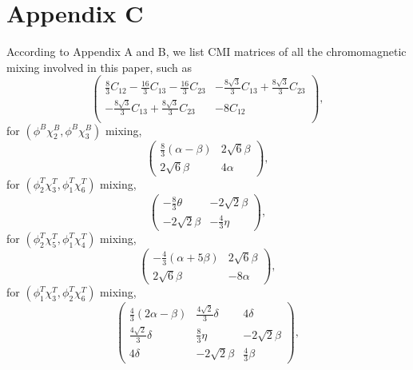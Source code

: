 \documentclass[prd,twocolumn,floatfix,nofootinbib]{revtex4}
\begin{document}
\section*{Appendix C}\label{AppendixC}
\setcounter{equation}{0}
\renewcommand{\theequation}{C\arabic{equation}}
According to Appendix A and B, we list CMI matrices of all the chromomagnetic mixing involved in this paper, such as
\begin{equation}\label{mixing23}
    \begin{pmatrix}
        \frac{8}{3}C_{12}-\frac{16}{3}C_{13}-\frac{16}{3}C_{23} & -\frac{8\sqrt{3}}{3}C_{13}+\frac{8\sqrt{3}}{3}C_{23} \\
        -\frac{8\sqrt{3}}{3}C_{13}+\frac{8\sqrt{3}}{3}C_{23} & -8C_{12} \\
    \end{pmatrix},
\end{equation}
for $(\phi^{B}\chi_{2}^{B},\phi^{B}\chi_{3}^{B})$ mixing,
\begin{equation}\label{21mixing36}
    \begin{pmatrix}
        \frac{8}{3}(\alpha-\beta)   & 2\sqrt{6}\beta \\
        2\sqrt{6}\beta              & 4\alpha
    \end{pmatrix},
\end{equation}
for $(\phi_{2}^{T}\chi_{3}^{T},\phi_{1}^{T}\chi_{6}^{T})$ mixing,
\begin{equation}\label{21mixing54}
    \begin{pmatrix}
        -\frac{8}{3}\theta  & -2\sqrt{2}\beta \\
        -2\sqrt{2}\beta     & -\frac{4}{3}\eta
    \end{pmatrix},
\end{equation}
for $(\phi_{2}^{T}\chi_{5}^{T},\phi_{1}^{T}\chi_{4}^{T})$ mixing,
\begin{equation}\label{12mixing36}
    \begin{pmatrix}
        -\frac{4}{3}(\alpha+5\beta) & 2\sqrt{6}\beta \\
        2\sqrt{6}\beta              & -8\alpha
    \end{pmatrix},
\end{equation}
for $(\phi_{1}^{T}\chi_{3}^{T},\phi_{2}^{T}\chi_{6}^{T})$ mixing,
\begin{equation}\label{221mixing245}
    \begin{pmatrix}
        \frac{4}{3}(2\alpha-\beta)  & \frac{4\sqrt{2}}{3}\delta & 4\delta \\
        \frac{4\sqrt{2}}{3}\delta   & \frac{8}{3}\eta           & -2\sqrt{2}\beta \\
        4\delta                     & -2\sqrt{2}\beta           & \frac{4}{3}\beta
    \end{pmatrix},
\end{equation}
\end{document}
